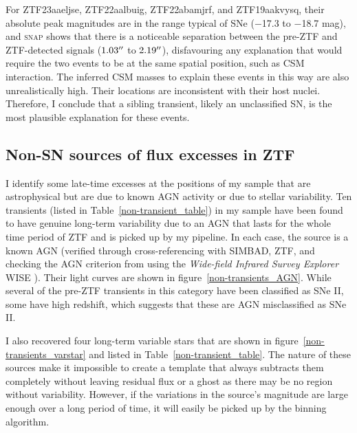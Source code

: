 \documentclass[a4paper,oneside,12pt, class=Latex/Classes/PhDthesisPSnPDF, crop=false]{standalone}
\begin{document}
For ZTF23aaeljse, ZTF22aalbuig, ZTF22abamjrf, and ZTF19aakvysq, their absolute peak magnitudes are in the range typical of SNe ($-$17.3 to $-$18.7 mag), and \textsc{snap} shows that there is a noticeable separation between the pre-ZTF and ZTF-detected signals ($1.03^{\prime\prime}$ to $2.19^{\prime\prime}$), disfavouring any explanation that would require the two events to be at the same spatial position, such as CSM interaction. The inferred CSM masses to explain these events in this way are also unrealistically high. Their locations are inconsistent with their host nuclei. Therefore, I conclude that a sibling transient, likely an unclassified SN, is the most plausible explanation for these events.


\subsection{Non-SN sources of flux excesses in ZTF}
\label{non-sn}
I identify some late-time excesses at the positions of my sample that are astrophysical but are due to known AGN activity or due to stellar variability. Ten transients (listed in Table~\ref{non-transient_table}) in my sample have been found to have genuine long-term variability due to an AGN that lasts for the whole time period of ZTF and is picked up by my pipeline. In each case, the source is a known AGN (verified through cross-referencing with SIMBAD, ZTF, and checking the AGN criterion from \citealt{WISE_crit} using the \textit{Wide-field Infrared Survey Explorer} WISE \citealt{WISE}). Their light curves are shown in figure~\ref{non-transients_AGN}. While several of the pre-ZTF transients in this category have been classified as SNe II, some have high redshift, which suggests that these are AGN misclassified as SNe II.

I also recovered four long-term variable stars that are shown in figure~\ref{non-transients_varstar} and listed in Table~\ref{non-transient_table}. The nature of these sources make it impossible to create a template that always subtracts them completely without leaving residual flux or a ghost as there may be no region without variability. However, if the variations in the source's magnitude are large enough over a long period of time, it will easily be picked up by the binning algorithm.
\end{document}
